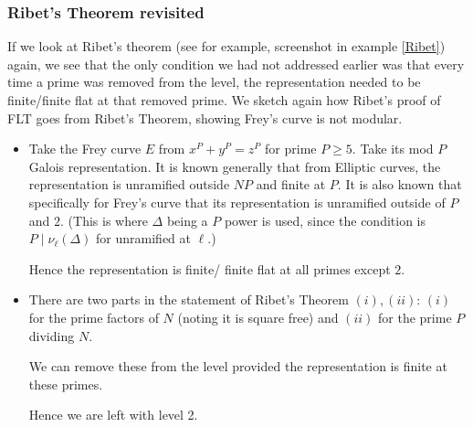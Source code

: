 \documentclass{article}
\theoremstyle{definition}
\theoremstyle{definition}
\theoremstyle{definition}
\begin{document}
\subsubsection{Ribet's Theorem revisited}

If we look at Ribet's theorem (see for example, screenshot in example \ref{Ribet}) again, we see that the only condition we had not addressed earlier was that every time a prime was removed from the level, the representation needed to be finite/finite flat at that removed prime.
\newline\newline
We sketch again how Ribet's proof of FLT goes from Ribet's Theorem, showing Frey's curve is not modular.

\begin{itemize}
    \item Take the Frey curve $E$ from $x^P+y^P=z^P$ for prime $P\geq 5$. Take its mod $P$ Galois representation. It is known generally that from Elliptic curves, the representation is unramified outside $NP$ and finite at $P$. It is also known that specifically for Frey's curve that its representation is unramified outside of $P$ and $2$. (This is where $\Delta$ being a $P$ power is used, since the condition is $P\mid \nu_\ell(\Delta)$ for unramified at $\ell$.)

    Hence the representation is finite/ finite flat at all primes except $2$.

    \item There are two parts in the statement of Ribet's Theorem $(i),(ii)$: $(i)$ for the prime factors of $N$ (noting it is square free) and $(ii)$ for the prime $P$ dividing $N$. 

    We can remove these from the level provided the representation is finite at these primes.

    Hence we are left with level 2.

\end{itemize}





\end{document}
